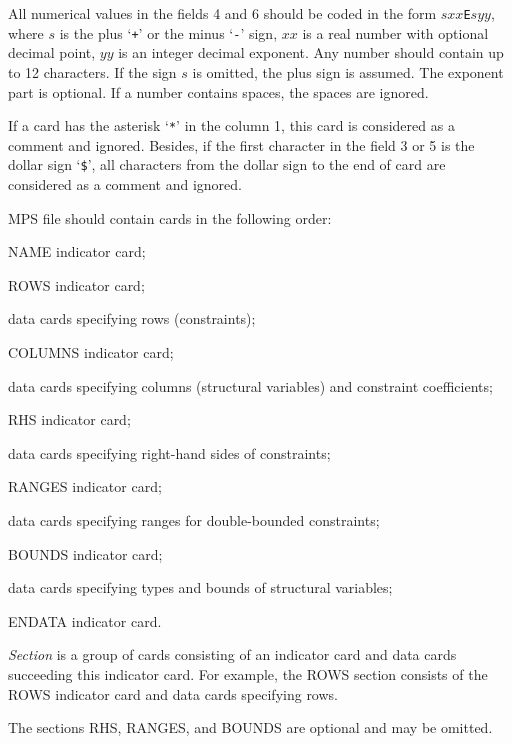 All numerical values in the fields 4 and 6 should be coded in the form
$sxx$\verb|E|$syy$, where $s$ is the plus `\verb|+|' or the minus
`\verb|-|' sign, $xx$ is a real number with optional decimal point,
$yy$ is an integer decimal exponent. Any number should contain up to 12
characters. If the sign $s$ is omitted, the plus sign is assumed. The
exponent part is optional. If a number contains spaces, the spaces are
ignored.


If a card has the asterisk `\verb|*|' in the column 1, this card is
considered as a comment and ignored. Besides, if the first character in
the field 3 or 5 is the dollar sign `\verb|$|', all characters from the
dollar sign to the end of card are considered as a comment and ignored.

MPS file should contain cards in the following order:


\Item{---}NAME indicator card;

\Item{---}ROWS indicator card;

\Item{---}data cards specifying rows (constraints);

\Item{---}COLUMNS indicator card;

\Item{---}data cards specifying columns (structural variables) and
constraint coefficients;

\Item{---}RHS indicator card;

\Item{---}data cards specifying right-hand sides of constraints;

\Item{---}RANGES indicator card;

\Item{---}data cards specifying ranges for double-bounded constraints;

\Item{---}BOUNDS indicator card;

\Item{---}data cards specifying types and bounds of structural
variables;

\Item{---}ENDATA indicator card.


{\it Section} is a group of cards consisting of an indicator card and
data cards succeeding this indicator card. For example, the ROWS section
consists of the ROWS indicator card and data cards specifying rows.

The sections RHS, RANGES, and BOUNDS are optional and may be omitted.

